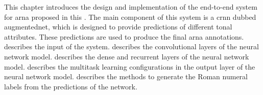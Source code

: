 

This chapter introduces the design and implementation of the
end-to-end system for \gls{arna} proposed in this
\thesisdiss{}. The main component of this system is a
\gls{crnn} dubbed \gls{augmentednet}, which is designed to
provide predictions of different tonal attributes. These
predictions are used to produce the final \gls{arna}
annotations.  describes the input of the
system.  describes the
convolutional layers of the neural network model.
 describes the dense and
recurrent layers of the neural network model.
 describes the multitask
learning configurations in the output layer of the neural
network model.
 describes
the methods to generate the Roman numeral labels from the
predictions of the network.
